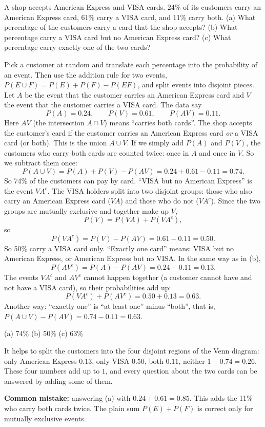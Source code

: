 
\begin{problem}
	A shop accepts American Express and VISA cards. 24\% of its customers carry
	an American Express card, 61\% carry a VISA card, and 11\% carry both.
	(a) What percentage of the customers carry a card that the shop accepts?
	(b) What percentage carry a VISA card but no American Express card?
	(c) What percentage carry exactly one of the two cards?
\end{problem}

\begin{solution}
	\idea Pick a customer at random and translate each percentage into the
	probability of an event. Then use the addition rule for two events,
	$P(E\cup F)=P(E)+P(F)-P(EF)$, and split events into disjoint pieces.
	 Let $A$ be the event that the customer carries an American
	Express card and $V$ the event that the customer carries a VISA card. The
	data say
	\[ P(A)=0.24,\qquad P(V)=0.61,\qquad P(AV)=0.11. \]
	Here $AV$ (the intersection $A\cap V$) means ``carries both cards''.
	 The shop accepts the customer's card if the customer carries
	an American Express card \emph{or} a VISA card (or both). This is the
	union $A\cup V$. If we simply add $P(A)$ and $P(V)$, the customers who
	carry both cards are counted twice: once in $A$ and once in $V$. So we
	subtract them once:
	\[ P(A\cup V)=P(A)+P(V)-P(AV)=0.24+0.61-0.11=0.74. \]
	So 74\% of the customers can pay by card.
	 ``VISA but no American Express'' is the event $VA^c$. The VISA
	holders split into two disjoint groups: those who also carry an American
	Express card ($VA$) and those who do not ($VA^c$). Since the two groups are
	mutually exclusive and together make up $V$,
	\[ P(V)=P(VA)+P(VA^c), \]
	so
	\[ P(VA^c)=P(V)-P(AV)=0.61-0.11=0.50. \]
	So 50\% carry a VISA card only.
	 ``Exactly one card'' means: VISA but no American Express, or
	American Express but no VISA. In the same way as in (b),
	\[ P(AV^c)=P(A)-P(AV)=0.24-0.11=0.13. \]
	The events $VA^c$ and $AV^c$ cannot happen together (a customer cannot have
	and not have a VISA card), so their probabilities add up:
	\[ P(VA^c)+P(AV^c)=0.50+0.13=0.63. \]
	Another way: ``exactly one'' is ``at least one'' minus ``both'', that is,
	$P(A\cup V)-P(AV)=0.74-0.11=0.63$.
	\begin{answer}
		(a) 74\% \quad (b) 50\% \quad (c) 63\%
	\end{answer}
	\begin{remark}
		It helps to split the customers into the four disjoint regions of the
		Venn diagram: only American Express $0.13$, only VISA $0.50$, both
		$0.11$, neither $1-0.74=0.26$. These four numbers add up to $1$, and
		every question about the two cards can be answered by adding some of
		them.\par
		\textbf{Common mistake:} answering (a) with $0.24+0.61=0.85$. This adds
		the 11\% who carry both cards twice. The plain sum $P(E)+P(F)$ is
		correct only for mutually exclusive events.
	\end{remark}
\end{solution}
